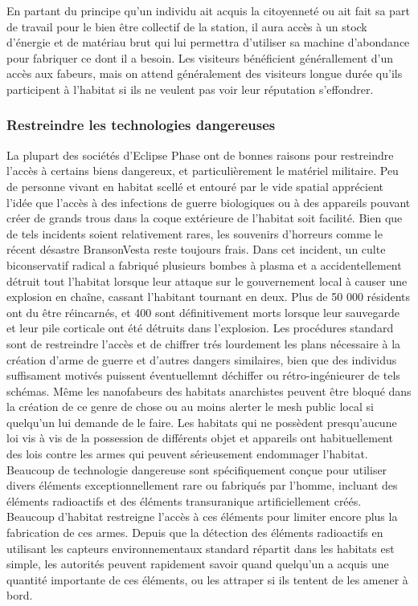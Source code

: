 En partant du principe qu'un individu ait acquis la citoyenneté ou ait fait sa part de travail pour le bien être collectif de la station, il aura accès à un stock d'énergie et de matériau brut qui lui permettra d'utiliser sa machine d'abondance pour fabriquer ce dont il a besoin. Les visiteurs bénéficient générallement d'un accès aux fabeurs, mais on attend généralement des visiteurs longue durée qu'ils participent à l'habitat si ils ne veulent pas voir leur réputation s'effondrer. 

\subsubsection{Restreindre les technologies dangereuses} \label{sec:restr-dang-techn} 

La plupart des sociétés d'Eclipse Phase ont de bonnes raisons pour restreindre l'accès à certains biens dangereux, et particulièrement le matériel militaire. Peu de personne vivant en habitat scellé et entouré par le vide spatial apprécient l'idée que l'accès à des infections de guerre biologiques ou à des appareils pouvant créer de grands trous dans la coque extérieure de l'habitat soit facilité. Bien que de tels incidents soient relativement rares, les souvenirs d'horreurs comme le récent désastre BransonVesta reste toujours frais. Dans cet incident, un culte biconservatif radical a fabriqué plusieurs bombes à plasma et a accidentellement détruit tout l'habitat lorsque leur attaque sur le gouvernement local à causer une explosion en chaîne, cassant l'habitant tournant en deux. Plus de 50 000 résidents ont du être réincarnés, et 400 sont définitivement morts lorsque leur sauvegarde et leur pile corticale ont été détruits dans l'explosion. Les procédures standard sont de restreindre l'accès et de chiffrer trés lourdement les plans nécessaire à la création d'arme de guerre et d'autres dangers similaires, bien que des individus suffisament motivés puissent éventuellemnt déchiffer ou rétro-ingénieurer de tels schémas. Même les nanofabeurs des habitats anarchistes peuvent être bloqué dans la création de ce genre de chose ou au moins alerter le mesh public local si quelqu'un lui demande de le faire. Les habitats qui ne possèdent presqu'aucune loi vis à vis de la possession de différents objet et appareils ont habituellement des lois contre les armes qui peuvent sérieusement endommager l'habitat. Beaucoup de technologie dangereuse sont spécifiquement conçue pour utiliser divers éléments exceptionnellement rare ou fabriqués par l'homme, incluant des éléments radioactifs et des éléments transuranique artificiellement créés. Beaucoup d'habitat restreigne l'accès à ces éléments pour limiter encore plus la fabrication de ces armes.  Depuis que la détection des éléments radioactifs en utilisant les capteurs environnementaux standard répartit dans les habitats est simple, les autorités peuvent rapidement savoir quand quelqu'un a acquis une quantité importante de ces éléments, ou les attraper si ils tentent de les amener à bord. 


